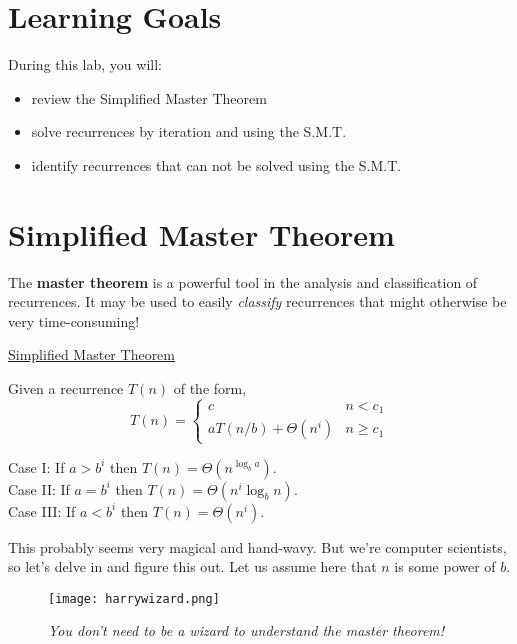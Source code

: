 

\section*{Learning Goals}
During this lab, you will:
\begin{itemize}
    \item review the Simplified Master Theorem
    \item solve recurrences by iteration and using the S.M.T.
    \item identify recurrences that can not be solved using the S.M.T.
\end{itemize}

\section*{Simplified Master Theorem}

The \textbf{master theorem} is a powerful tool in the analysis and classification of recurrences. It may be used to easily \textit{classify} recurrences that might otherwise be very time-consuming!

\begin{framed}
    \begin{center}\underline{Simplified Master Theorem}\end{center}
    Given a recurrence $T(n)$ of the form,
    $$
        T(n) = \left\{
        \begin{array}{lr}
            c & n < c_1\\
            a T(n/b) + \Theta(n^i) & n \geq c_1
        \end{array}\right.
    $$

    Case I: If $a > b^i$ then $T(n) = \Theta(n^{\log_b a})$.\\

    Case II: If $a = b^i$ then $T(n) = \Theta(n^i \log_b n)$.\\

    Case III: If $a < b^i$ then $T(n) = \Theta(n^i)$.
\end{framed}

This probably seems very magical and hand-wavy. But we're computer scientists, so let's delve in and figure this out. Let us assume here that $n$ is some power of $b$.

\begin{figure}[ht]
    \centering
    \texttt{[image: harrywizard.png]}
    \caption*{\textit{You don't need to be a wizard to understand the master theorem!}}
\end{figure}

